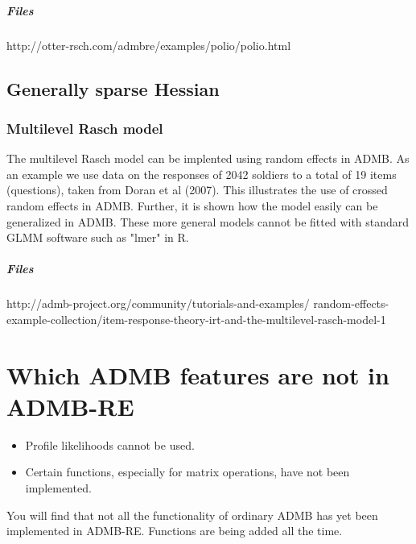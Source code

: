 \documentclass[12pt,letter,reqno]{book}
\begin{document}
\paragraph{Files} http://otter-rsch.com/admbre/examples/polio/polio.html

\section{Generally sparse Hessian}

\subsection{Multilevel Rasch model}
The multilevel Rasch model can be implented using random effects in ADMB. As an example we use data on the responses of 
2042 soldiers to a total of 19 items (questions), taken from Doran et al (2007). This illustrates the use of crossed random effects in ADMB. 
Further, it is shown how the model easily can be generalized in ADMB. These more general models cannot be fitted with standard GLMM software 
such as "lmer" in R.

\paragraph{Files} http://admb-project.org/community/tutorials-and-examples/
random-effects-example-collection/item-response-theory-irt-and-the-multilevel-rasch-model-1


\chapter{Which ADMB features are not in ADMB-RE}
\begin{itemize}
\item Profile likelihoods cannot be used.
\item Certain functions, especially for matrix operations, have not been implemented.
\end{itemize}

You will find that not all the functionality of ordinary ADMB has yet been implemented 
in ADMB-RE. Functions are being added all the time.
\end{document}
